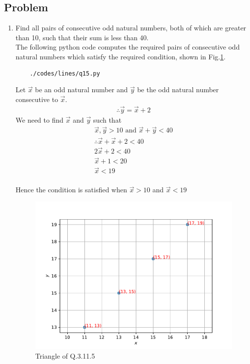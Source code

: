 \subsection{Problem}
\renewcommand{\theequation}{\theenumi}
\begin{enumerate}[label=\thesection.\arabic*.,ref=\thesection.\theenumi]
	\item Find all pairs of consecutive odd natural numbers, both of which are greater than 10, such that their sum is less than 40.\\
	The following python code computes the required pairs of consecutive odd natural numbers which satisfy the required condition, shown in Fig.\ref{fig:qfifteen}.
	\begin{lstlisting}
	./codes/lines/q15.py
	\end{lstlisting}
	
	\solution Let $\vec{x}$ be an odd natural number and $\vec{y}$ be the odd natural number consecutive to $\vec{x}$.
	\begin{align}
	\therefore \vec{y}=\vec{x}+2
	\end{align}
	We need to find $\vec{x}$ and $\vec{y}$  such that 
	\begin{multline}
\vec{x},\vec{y} >10 \text{ and } \vec{x}+\vec{y}<40\\
\therefore \vec{x}+\vec{x}+2<40\\
2\vec{x}+2<40\\
\vec{x}+1<20\\
\vec{x}<19\\
	\end{multline}
	
	
	Hence the condition is satisfied when $\vec{x}>10$ and $\vec{x}<19$
	
	\begin{figure}[!ht]
	\centering
	\includegraphics[width=\columnwidth]{./figs/lines/q15.pdf}
	\caption{Triangle of Q.3.11.5}
	\label{fig:qfifteen}	
	\end{figure}
	
	
\end{enumerate}
